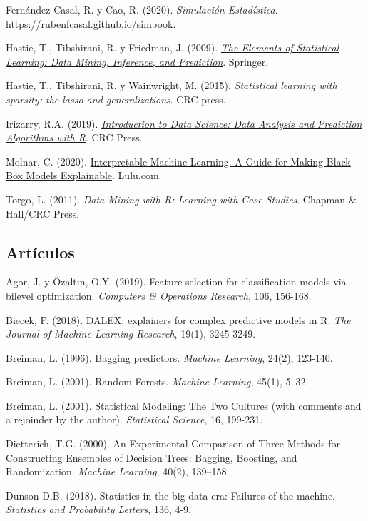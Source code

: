 \documentclass[]{book}
\theoremstyle{break}
\theoremstyle{definition}
\theoremstyle{definition}
\theoremstyle{definition}
\theoremstyle{remark}
\begin{document}
Fernández-Casal, R. y Cao, R. (2020). \emph{Simulación Estadística}.
\url{https://rubenfcasal.github.io/simbook}.

Hastie, T., Tibshirani, R. y Friedman, J. (2009).
\emph{\href{https://web.stanford.edu/~hastie/ElemStatLearn}{The Elements
of Statistical Learning: Data Mining, Inference, and Prediction}}.
Springer.

Hastie, T., Tibshirani, R. y Wainwright, M. (2015). \emph{Statistical
learning with sparsity: the lasso and generalizations}. CRC press.

Irizarry, R.A. (2019).
\emph{\href{https://rafalab.github.io/dsbook}{Introduction to Data
Science: Data Analysis and Prediction Algorithms with R}}. CRC Press.

Molnar, C. (2020).
\href{https://christophm.github.io/interpretable-ml-book}{Interpretable
Machine Learning. A Guide for Making Black Box Models Explainable}.
Lulu.com.

Torgo, L. (2011). \emph{Data Mining with R: Learning with Case Studies}.
Chapman \& Hall/CRC Press.

\subsection*{Artículos}\label{artuxedculos}

Agor, J. y Özaltın, O.Y. (2019). Feature selection for classification
models via bilevel optimization. \emph{Computers \& Operations
Research}, 106, 156-168.

Biecek, P. (2018).
\href{http://www.jmlr.org/papers/volume19/18-416/18-416.pdf}{DALEX:
explainers for complex predictive models in R}. \emph{The Journal of
Machine Learning Research}, 19(1), 3245-3249.

Breiman, L. (1996). Bagging predictors. \emph{Machine Learning}, 24(2),
123-140.

Breiman, L. (2001). Random Forests. \emph{Machine Learning}, 45(1),
5--32.

Breiman, L. (2001). Statistical Modeling: The Two Cultures (with
comments and a rejoinder by the author). \emph{Statistical Science}, 16,
199-231.

Dietterich, T.G. (2000). An Experimental Comparison of Three Methods for
Constructing Ensembles of Decision Trees: Bagging, Boosting, and
Randomization. \emph{Machine Learning}, 40(2), 139--158.

Dunson D.B. (2018). Statistics in the big data era: Failures of the
machine. \emph{Statistics and Probability Letters}, 136, 4-9.
\end{document}
